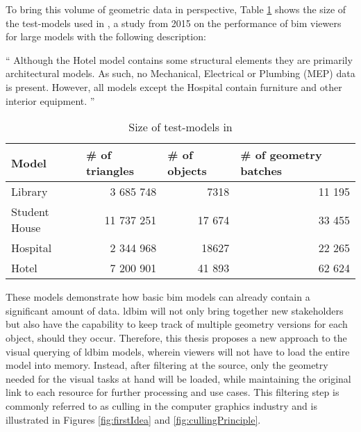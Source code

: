 To bring this volume of geometric data in perspective, Table \ref{tab:sizeModels} shows the size of the test-models used in \cite{Johansson2015} , a study from 2015 on the performance of \ac{bim} viewers for large models with the following description:

\enquote{
	Although the Hotel model contains some structural elements they are primarily architectural models. As such, no Mechanical, Electrical or Plumbing (MEP) data is present. However, all models except the Hospital contain furniture and other interior equipment.
} \parencite{Johansson2015}

\begin{table}[h]
	\centering
	\begin{tabular}{@{}lrrr@{}}
		\toprule
		Model         & \multicolumn{1}{l}{\# of  triangles} & \multicolumn{1}{l}{\# of objects} & \multicolumn{1}{l}{\# of geometry batches} \\ \midrule
		Library       & 3 685 748                            & 7318                              & 11 195                                     \\
		Student House & 11 737 251                           & 17 674                            & 33 455                                     \\
		Hospital      & 2 344 968                            & 18627                             & 22 265                                     \\
		Hotel         & 7 200 901                            & 41 893                            & 62 624                                     \\ \bottomrule
	\end{tabular}
	\caption{Size of test-models in \cite{Johansson2015}}
	\label{tab:sizeModels}
\end{table}

These models demonstrate how basic \ac{bim} models can already contain a significant amount of data. \ac{ldbim} will not only bring together new stakeholders but also have the capability to keep track of multiple geometry versions for each object, should they occur. Therefore, this thesis proposes a new approach to the visual querying of \ac{ldbim} models, wherein viewers will not have to load the entire model into memory. Instead, after filtering at the source, only the geometry needed for the visual tasks at hand will be loaded, while maintaining the original link to each resource for further processing and use cases. This filtering step is commonly referred to as culling in the computer graphics industry and is illustrated in Figures \ref{fig:firstIdea} and \ref{fig:cullingPrinciple}.

